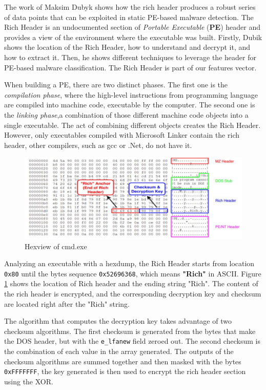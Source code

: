 The work of Maksim Dubyk \cite{dubyk2019sans} shows how the rich header produces a robust series of data points that can be exploited in static PE-based malware detection. The Rich Header is an undocumented section of \textit{Portable Executable} (\textbf{PE}) header and provides a view of the environment where the executable was built. Firstly, Dubik shows the location of the Rich Header, how to understand and decrypt it, and how to extract it. Then, he shows different techniques to leverage the header for PE-based malware classification. The Rich Header is part of our features vector.

When building a PE, there are two distinct phases. The first one is the \textit{compilation phase}, where the high-level instructions from programming language are compiled into machine code, executable by the computer. The second one is the \textit{linking phase},a combination of those different machine code objects into a single executable. The act of combining different objects creates the Rich Header. However, only executables compiled with Microsoft Linker contain the rich header, other compilers, such as gcc or .Net,  do not have it.

\begin{figure}[!h]
	\centering
	\includegraphics[width=1.0\columnwidth]{cmd.png}
	\caption{Hexview of cmd.exe}
	\label{fig:cmd}
\end{figure}

Analyzing an executable with a hexdump, the Rich Header starts from location \texttt{0x80} until the bytes sequence \texttt{0x52696368}, which means \textbf{"Rich"} in ASCII. Figure \ref{fig:cmd} shows the location of Rich header and the ending string "Rich". The content of the rich header is encrypted, and the corresponding decryption key and checksum are located right after the "Rich" string. 

The algorithm that computes the decryption key takes advantage of two checksum algorithms. The first checksum is generated from the bytes that make the DOS header, but with the \texttt{e\_lfanew} field zeroed out\cite{richHeaderHunting}. The second checksum is the combination of each value in the array generated. The outputs of the checksum algorithms are summed together and then masked with the bytes \texttt{0xFFFFFFF}, the key generated is then used to encrypt the rich header section using the XOR.

